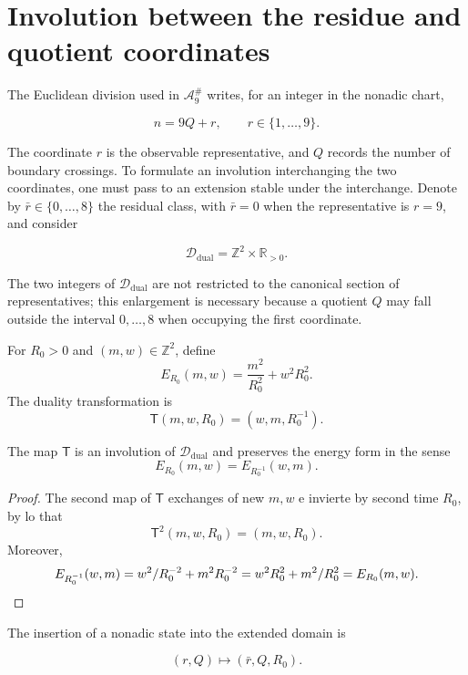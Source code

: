 \section{Involution between the residue and quotient coordinates}
\label{sec:dualidad-visible-memoria}

The Euclidean division used in \(\mathcal A_9^\#\) writes, for an integer in
the nonadic chart,

\[
n=9Q+r,
\qquad r\in\{1,\ldots,9\}.
\]

The coordinate \(r\) is the observable representative, and \(Q\) records the
number of boundary crossings. To formulate an involution interchanging
the two coordinates, one must pass to an extension stable under the
interchange. Denote by \(\bar r\in\{0,\ldots,8\}\) the residual class,
with \(\bar r=0\) when the representative is \(r=9\), and consider

\[
\mathscr D_{\mathrm{dual}}=\mathbb Z^2\times\mathbb R_{>0}.
\]

The two integers of \(\mathscr D_{\mathrm{dual}}\) are not restricted to the canonical section of
representatives; this enlargement is necessary because a quotient \(Q\) may
fall outside the interval \(0,\ldots,8\) when occupying the first coordinate.

\begin{definition}
For \(R_0>0\) and \((m,w)\in\mathbb Z^2\), define
\[
E_{R_0}(m,w)=\frac{m^2}{R_0^2}+w^2R_0^2.
\]
The duality transformation is
\[
\mathsf T(m,w,R_0)=(w,m,R_0^{-1}).
\]
\end{definition}

\begin{theorem}
\label{thm:dualidad-visible-memoria}
The map \(\mathsf T\) is an involution of \(\mathscr D_{\mathrm{dual}}\) and preserves
the energy form in the sense
\[
E_{R_0}(m,w)=E_{R_0^{-1}}(w,m).
\]
\end{theorem}

\begin{proof}
The second map of \(\mathsf T\) exchanges of new \(m,w\) e
invierte by second time \(R_0\), by lo that
\[
\mathsf T^2(m,w,R_0)=(m,w,R_0).
\]
Moreover,
\[
E_{R_0^{-1}}(w,m)
=\frac{w^2}{R_0^{-2}}+m^2R_0^{-2}
=w^2R_0^2+\frac{m^2}{R_0^2}
=E_{R_0}(m,w).\qedhere
\]
\end{proof}

The insertion of a nonadic state into the extended domain is

\[
(r,Q)\longmapsto(\bar r,Q,R_0).
\]

